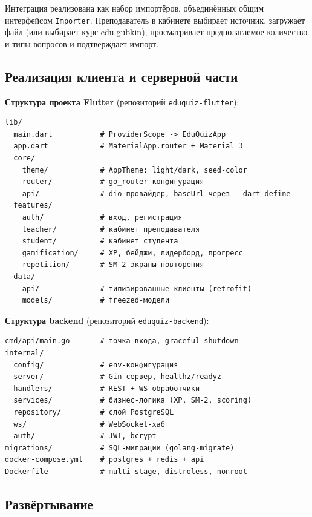 Интеграция реализована как набор импортёров, объединённых
общим интерфейсом \texttt{Importer}. Преподаватель в кабинете
выбирает источник, загружает файл (или выбирает курс edu.gubkin),
просматривает предполагаемое количество и типы вопросов
и подтверждает импорт.

\subsection{Реализация клиента и серверной части}

\textbf{Структура проекта Flutter}
(репозиторий \texttt{eduquiz-flutter}):
\begin{lstlisting}
lib/
  main.dart           # ProviderScope -> EduQuizApp
  app.dart            # MaterialApp.router + Material 3
  core/
    theme/            # AppTheme: light/dark, seed-color
    router/           # go_router конфигурация
    api/              # dio-провайдер, baseUrl через --dart-define
  features/
    auth/             # вход, регистрация
    teacher/          # кабинет преподавателя
    student/          # кабинет студента
    gamification/     # XP, бейджи, лидерборд, прогресс
    repetition/       # SM-2 экраны повторения
  data/
    api/              # типизированные клиенты (retrofit)
    models/           # freezed-модели
\end{lstlisting}

\textbf{Структура backend} (репозиторий \texttt{eduquiz-backend}):
\begin{lstlisting}
cmd/api/main.go       # точка входа, graceful shutdown
internal/
  config/             # env-конфигурация
  server/             # Gin-сервер, healthz/readyz
  handlers/           # REST + WS обработчики
  services/           # бизнес-логика (XP, SM-2, scoring)
  repository/         # слой PostgreSQL
  ws/                 # WebSocket-хаб
  auth/               # JWT, bcrypt
migrations/           # SQL-миграции (golang-migrate)
docker-compose.yml    # postgres + redis + api
Dockerfile            # multi-stage, distroless, nonroot
\end{lstlisting}


\subsection{Развёртывание}

